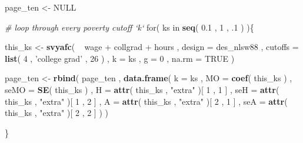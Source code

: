 \documentclass[]{book}
\newenvironment{Shaded}{\begin{snugshade}}{\end{snugshade}}
\newcommand{\KeywordTok}[1]{\textcolor[rgb]{0.13,0.29,0.53}{\textbf{{#1}}}}
\newcommand{\DataTypeTok}[1]{\textcolor[rgb]{0.13,0.29,0.53}{{#1}}}
\newcommand{\DecValTok}[1]{\textcolor[rgb]{0.00,0.00,0.81}{{#1}}}
\newcommand{\FloatTok}[1]{\textcolor[rgb]{0.00,0.00,0.81}{{#1}}}
\newcommand{\StringTok}[1]{\textcolor[rgb]{0.31,0.60,0.02}{{#1}}}
\newcommand{\CommentTok}[1]{\textcolor[rgb]{0.56,0.35,0.01}{\textit{{#1}}}}
\newcommand{\OtherTok}[1]{\textcolor[rgb]{0.56,0.35,0.01}{{#1}}}
\newcommand{\NormalTok}[1]{{#1}}
\begin{document}
\begin{Shaded}
\begin{Highlighting}[]
\NormalTok{page_ten <-}\StringTok{ }\OtherTok{NULL}

\CommentTok{# loop through every poverty cutoff `k`}
\NormalTok{for( ks in }\KeywordTok{seq}\NormalTok{( }\FloatTok{0.1} \NormalTok{, }\DecValTok{1} \NormalTok{, .}\DecValTok{1} \NormalTok{) )\{}
    
    \NormalTok{this_ks <-}
\StringTok{        }\KeywordTok{svyafc}\NormalTok{(}
            \NormalTok{~}\StringTok{ }\NormalTok{wage +}\StringTok{ }\NormalTok{collgrad +}\StringTok{ }\NormalTok{hours , }
            \DataTypeTok{design =} \NormalTok{des_nlsw88 , }
            \DataTypeTok{cutoffs =} \KeywordTok{list}\NormalTok{( }\DecValTok{4} \NormalTok{, }\StringTok{'college grad'} \NormalTok{, }\DecValTok{26} \NormalTok{) , }
            \DataTypeTok{k =} \NormalTok{ks , }
            \DataTypeTok{g =} \DecValTok{0} \NormalTok{, }
            \DataTypeTok{na.rm =} \OtherTok{TRUE} 
           \NormalTok{)}
    
    \NormalTok{page_ten <-}
\StringTok{        }\KeywordTok{rbind}\NormalTok{(}
            \NormalTok{page_ten ,}
            \KeywordTok{data.frame}\NormalTok{( }
                \DataTypeTok{k =} \NormalTok{ks , }
                \DataTypeTok{MO =} \KeywordTok{coef}\NormalTok{( this_ks ) ,}
                \DataTypeTok{seMO =} \KeywordTok{SE}\NormalTok{( this_ks ) ,}
                \DataTypeTok{H =} \KeywordTok{attr}\NormalTok{( this_ks , }\StringTok{"extra"} \NormalTok{)[ }\DecValTok{1} \NormalTok{, }\DecValTok{1} \NormalTok{] ,}
                \DataTypeTok{seH =} \KeywordTok{attr}\NormalTok{( this_ks , }\StringTok{"extra"} \NormalTok{)[ }\DecValTok{1} \NormalTok{, }\DecValTok{2} \NormalTok{] ,}
                \DataTypeTok{A =} \KeywordTok{attr}\NormalTok{( this_ks , }\StringTok{"extra"} \NormalTok{)[ }\DecValTok{2} \NormalTok{, }\DecValTok{1} \NormalTok{] ,}
                \DataTypeTok{seA =} \KeywordTok{attr}\NormalTok{( this_ks , }\StringTok{"extra"} \NormalTok{)[ }\DecValTok{2} \NormalTok{, }\DecValTok{2} \NormalTok{]}
          \NormalTok{)}
        \NormalTok{)}
    
\NormalTok{\}}
\end{Highlighting}
\end{Shaded}
\end{document}

